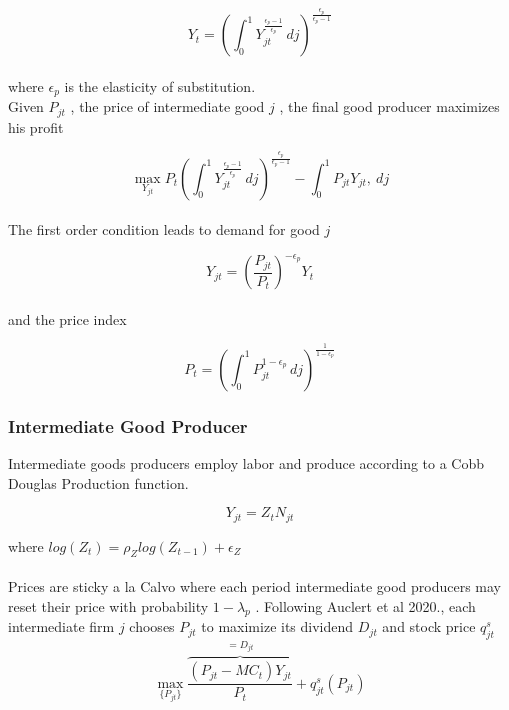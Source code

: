 \documentclass[titlepage]{\econtex}\providecommand{\texname}{BufferStockTheory}
\begin{document}
$$ Y_{t} = \left(\int_{0}^{1} Y_{jt}^{\frac{\epsilon_{p}-1}{\epsilon_{p}}}\, dj\right)^{\frac{\epsilon_{p}}{\epsilon_{p}-1}}$$ \\

where $\epsilon_{p}$ is the elasticity of substitution. \\ 

Given $P_{jt}$ , the price of intermediate good $j$ ,  the final good producer maximizes his profit

$$ \max_{Y_{jt}} P_{t} \left(\int_{0}^{1} Y_{jt}^{\frac{\epsilon_{p}-1}{\epsilon_{p}}}\, dj\right)^{\frac{\epsilon_{p}}{\epsilon_{p}-1}} - \int_{0}^{1} P_{jt} Y_{jt} ,\ dj $$ \\


The first order condition leads to demand for good $j$

\begin{equation} Y_{jt} = \left(\frac {P_{jt}}{P_{t}}\right)^{- \epsilon_{p}} Y_{t}\end{equation} \\

and the price index

\begin{equation} P_{t} = \left(\int_{0}^{1} P_{jt}^{1-\epsilon_{p}}\,dj \right )^{\frac{1}{1-\epsilon_{p}}} \end{equation}


\hypertarget{Intermediate Good Producer}{}
\subsubsection{Intermediate Good Producer}

Intermediate goods producers  employ labor and produce according to a Cobb Douglas Production function.  

$$Y_{jt} =  Z_{t}  N_{jt}$$ 

where $log(Z_{t}) = \rho_{Z} log( Z_{t-1}) + \epsilon_{Z}$ \\ \\


Prices are sticky a la Calvo where each period intermediate good producers may reset their price with probability $ 1 -\lambda_{p}$ . Following Auclert et al 2020., each intermediate firm $j$ chooses $P_{jt}$ to maximize its dividend $D_{jt}$ and  stock price $q^{s}_{jt} $ \\ 
 
 $$\max_{\{P_{jt}\}} \overbrace{\frac{(P_{jt} - MC_{t})Y_{jt}}{P_{t}}}^{=D_{jt}} + q^{s}_{jt}\left(P_{jt}\right) $$ \\
 
\end{document}
